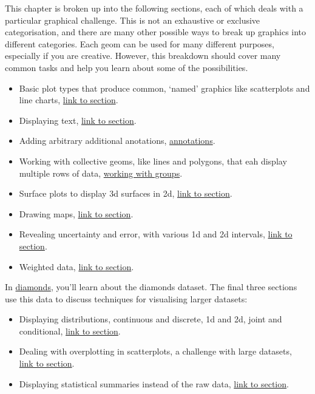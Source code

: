 This chapter is broken up into the following sections, each of which
deals with a particular graphical challenge. This is not an exhaustive
or exclusive categorisation, and there are many other possible ways to
break up graphics into different categories. Each geom can be used for
many different purposes, especially if you are creative. However, this
breakdown should cover many common tasks and help you learn about some
of the possibilities.

\begin{itemize}
\item
  Basic plot types that produce common, `named' graphics like
  scatterplots and line charts, \hyperref[sec:basics]{link to section}.
\item
  Displaying text, \hyperref[sec:labelling]{link to section}.
\item
  Adding arbitrary additional anotations,
  \hyperref[sec:annotations]{annotations}.
\item
  Working with collective geoms, like lines and polygons, that eah
  display multiple rows of data, \hyperref[sec:grouping]{working with
  groups}.
\item
  Surface plots to display 3d surfaces in 2d,
  \hyperref[sec:surface]{link to section}.
\item
  Drawing maps, \hyperref[sec:maps]{link to section}.
\item
  Revealing uncertainty and error, with various 1d and 2d intervals,
  \hyperref[sec:uncertainty]{link to section}.
\item
  Weighted data, \hyperref[sec:weighting]{link to section}.
\end{itemize}

In \hyperref[sec:diamonds]{diamonds}, you'll learn about the diamonds
dataset. The final three sections use this data to discuss techniques
for visualising larger datasets:

\begin{itemize}
\item
  Displaying distributions, continuous and discrete, 1d and 2d, joint
  and conditional, \hyperref[sec:distributions]{link to section}.
\item
  Dealing with overplotting in scatterplots, a challenge with large
  datasets,\\
   \hyperref[sec:overplotting]{link to section}.
\item
  Displaying statistical summaries instead of the raw data,
  \hyperref[sec:summary]{link to section}.
\end{itemize}

